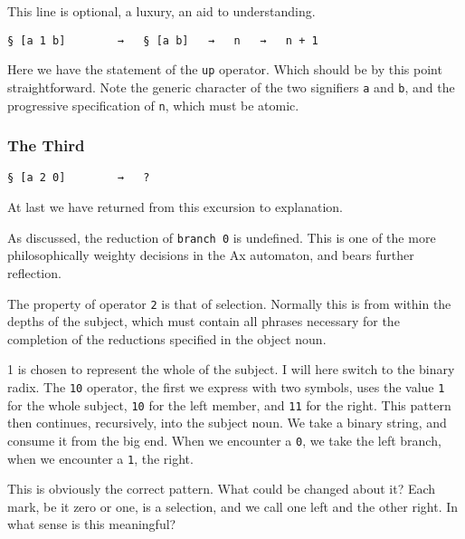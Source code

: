 \documentclass[twoside]{article}
\begin{document}
This line is optional, a luxury, an aid to understanding.

\begin{lstlisting}[style=listingcode]
§ [a 1 b]        →   § [a b]   →   n   →   n + 1
\end{lstlisting}

\noindent
Here we have the statement of the \texttt{up} operator. Which should be by this point straightforward. Note the generic character of the two signifiers \lstinline[style=inlinecode]{a} and \lstinline[style=inlinecode]{b}, and the progressive specification of \lstinline[style=inlinecode]{n}, which must be atomic.

\subsubsection{The Third}

\begin{lstlisting}[style=listingcode]
§ [a 2 0]        →   ?
\end{lstlisting}

\noindent
At last we have returned from this excursion to explanation.

As discussed, the reduction of \texttt{branch 0} is undefined. This is one of the more philosophically weighty decisions in the Ax automaton, and bears further reflection.

The property of operator \texttt{2} is that of selection. Normally this is from within the depths of the subject, which must contain all phrases necessary for the completion of the reductions specified in the object noun.

1 is chosen to represent the whole of the subject. I will here switch to the binary radix. The \texttt{10} operator, the first we express with two symbols, uses the value \texttt{1} for the whole subject, \texttt{10} for the left member, and \texttt{11} for the right. This pattern then continues, recursively, into the subject noun. We take a binary string, and consume it from the big end. When we encounter a \texttt{0}, we take the left branch, when we encounter a \texttt{1}, the right.

This is obviously the correct pattern. What could be changed about it? Each mark, be it zero or one, is a selection, and we call one left and the other right. In what sense is this meaningful?
\end{document}
